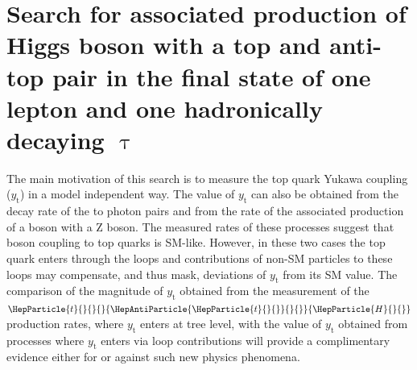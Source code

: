 \documentclass[12pt, a4paper]{article}
\newcommand{\yt}{\ensuremath{y_{\mathrm{t}}}}
\DeclareRobustCommand{\PH}{{\HepParticle{H}{}{}}\xspace}
\DeclareRobustCommand{\PQt}{\HepParticle{t}{}{}} %
\DeclareRobustCommand{\PAQt}{{\HepAntiParticle{\PQt}{}{}}\xspace} %
\newcommand{\ttbar}{\PQt{}\PAQt} %
\newcommand{\ttH}{\ttbar\PH}
\begin{document}
\section{Search for associated production of Higgs boson with a top and anti-top pair in the final state of one lepton and one hadronically decaying $\uptau$} \label{ttH}

The main motivation of this search is to measure the top quark Yukawa coupling ($\yt$) in a model independent way. The value of $\yt$ can also be obtained from the decay rate of the \PH to photon pairs\cite{Biswas:2013xva} and from the rate of the associated production of a \PH boson with a Z boson\cite{Hespel:2015zea}. The measured rates of these processes suggest that  \PH boson coupling to top quarks is SM-like. However, in these two cases the top quark enters through the loops and contributions of non-SM particles to these loops may compensate, and thus mask, deviations of $\yt$ from its SM value. The comparison of the magnitude of $\yt$ obtained from the measurement of the $\ttH$ production rates, where $\yt$ enters at tree level, with the value of $\yt$ obtained from processes where $\yt$ enters via loop contributions will provide a complimentary evidence either for or against such new physics phenomena.
\end{document}
